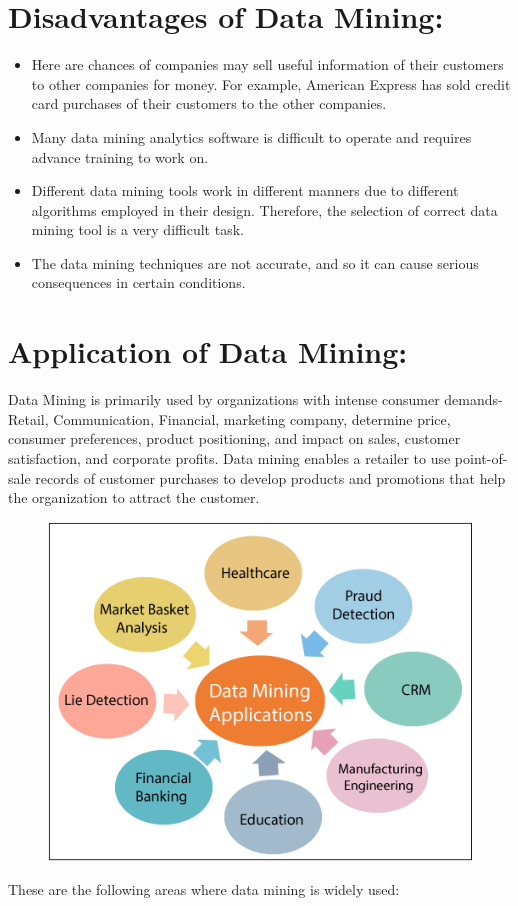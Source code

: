 \documentclass[a4paper,10pt]{article}
\begin{document}
\section{Disadvantages of Data Mining:}
\begin{itemize}
	\item Here are chances of companies may sell useful information of their customers to other companies for money. For example, American Express has sold credit card purchases of their customers to the other companies.
	\item Many data mining analytics software is difficult to operate and requires advance training to work on.
	\item Different data mining tools work in different manners due to different algorithms employed in their design. Therefore, the selection of correct data mining tool is a very difficult task.
	\item The data mining techniques are not accurate, and so it can cause serious consequences in certain conditions.
\end{itemize}

\section{Application of Data Mining:}
Data Mining is primarily used by organizations with intense consumer demands- Retail, Communication, Financial, marketing company, determine price, consumer preferences, product positioning, and impact on sales, customer satisfaction, and corporate profits. Data mining enables a retailer to use point-of-sale records of customer purchases to develop products and promotions that help the organization to attract the customer.

\begin{figure}[H]
	\centering
	\includegraphics[width=\linewidth]{DApp.png}
\end{figure}
These are the following areas where data mining is widely used:
\end{document}
